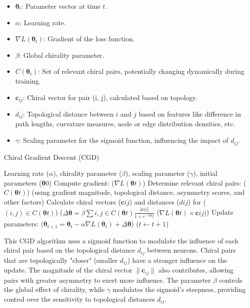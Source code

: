 \documentclass[12pt, a4paper]{article}
\begin{document}
\begin{itemize}
    \item \(\boldsymbol{\theta}_t\): Parameter vector at time \(t\).
    \item \(\alpha\): Learning rate.
    \item \(\nabla L(\boldsymbol{\theta}_t)\): Gradient of the loss function.
    \item \(\beta\): Global chirality parameter.
    \item \(C(\boldsymbol{\theta}_t)\): Set of relevant chiral pairs, potentially changing dynamically during training.
    \item \(\mathbf{c}_{ij}\): Chiral vector for pair (i, j), calculated based on topology.
    \item \(d_{ij}\): Topological distance between \(i\) and \(j\) based on features like difference in path lengths, curvature measures, node or edge distribution densities, etc.
    \item \(\gamma\): Scaling parameter for the sigmoid function, influencing the impact of \(d_{ij}\).
\end{itemize}

\begin{algorithm}
\caption{Chiral Gradient Descent (CGD)}
\label{alg:cgd}
\begin{algorithmic}
\Require Learning rate ($\alpha$), chirality parameter ($\beta$), scaling parameter ($\gamma$), initial parameters ($\boldsymbol{\theta}0$)
	\State Compute gradient: ($\nabla L(\boldsymbol{\theta}t)$)
	\State Determine relevant chiral pairs: ($C(\boldsymbol{\theta}t)$) (using gradient magnitude, topological distance, asymmetry scores, and other factors)
	\State Calculate chiral vectors ($\mathbf{c}{ij}$) and distances ($d{ij}$) for ($(i, j) \in C(\boldsymbol{\theta}t)$)
	\State ($\Delta \boldsymbol{\theta} = \beta \sum{i,j \in C(\boldsymbol{\theta}t)} \frac{| \mathbf{c}{ij} |}{1 + e^{-\gamma d{ij}}}$ ($\nabla L(\boldsymbol{\theta}t) \times \mathbf{c}{ij})$)
	\State Update parameters: ($\boldsymbol{\theta}_{t+1} = \boldsymbol{\theta}_t - \alpha \nabla L(\boldsymbol{\theta}_t) + \Delta \boldsymbol{\theta}$)
	\State ($t \gets t + 1$)
\EndWhile
\end{algorithmic}
\end{algorithm}


This CGD algorithm uses a sigmoid function to modulate the influence of each chiral pair based on the topological distance \(d_{ij}\) between neurons. Chiral pairs that are topologically "closer" (smaller \(d_{ij}\)) have a stronger influence on the update. The magnitude of the chiral vector \(\| \mathbf{c}_{ij} \|\) also contributes, allowing pairs with greater asymmetry to exert more influence. The parameter \(\beta\) controls the global effect of chirality, while \(\gamma\) modulates the sigmoid's steepness, providing control over the sensitivity to topological distances \(d_{ij}\).
\end{document}
